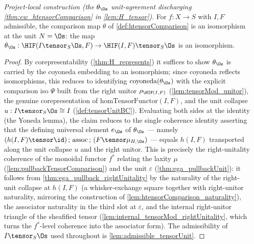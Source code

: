 \begin{lemma}
  \label{lem:htensorComparison_unit_isIso}
  \textit{Project-local construction (the $\theta_{\Os}$ unit-agreement discharging \cref{thm:ew_htensorComparison} in \cref{lem:H_tensor}).}
  For $f : X \to S$ with $I, F$ admissible, the comparison map $\theta$ of \cref{def:htensorComparison}
  is an isomorphism at the unit $N = \Os$: the map
  $\theta_{\Os} : \HIF(I \tensor_S \Os, F) \to \HIF(I,F) \tensor_S \Os$ is an isomorphism.
  \begin{proof}
    By corepresentability (\cref{thm:H_represents}) it suffices to show $\theta_{\Os}$ is carried by
    the coyoneda embedding to an isomorphism; since coyoneda reflects isomorphisms, this reduces to
    identifying $\mathrm{coyoneda}(\theta_{\Os})$ with the explicit comparison iso $\Psi$ built from
    the right unitor $\rho_{\HIF(I,F)}$ (\cref{lem:tensorMod_unitor}), the genuine corepresentation of
    $\mathrm{homTensorFunctor}(I,F)$, and the unit collapse $u : I \tensor_S \Os \cong I$
    (\cref{def:tensorUnitBC}). Evaluating both sides at the identity (the Yoneda lemma), the claim
    reduces to the single coherence identity asserting that the defining universal element $e_{\Os}$ of
    $\theta_{\Os}$ — namely $(h(I,F) \tensor \id) \,;\, \mathrm{assoc} \,;\, (F \tensor \mu_{H,\Os})$ —
    equals $h(I,F)$ transported along the unit collapse $u$ and the right unitor. This is precisely
    the right-unitality coherence of the monoidal functor $f^*$ relating the laxity $\mu$
    (\cref{lem:pullbackTensorComparison}) and the unit $\varepsilon$ (\cref{thm:ega_pullbackUnit}): it
    follows from \cref{thm:ega_pullback_rightUnitality} by the naturality of the right-unit collapse
    at $h(I,F)$ (a whisker-exchange square together with right-unitor naturality, mirroring the
    construction of \cref{lem:htensorComparison_naturality}), the associator naturality in the third
    slot at $\varepsilon$, and the internal right-unitor triangle of the sheafified tensor
    (\cref{lem:internal_tensorMod_rightUnitality}, which turns the $f^*$-level coherence into the
    associator form). The admissibility of $I \tensor_S \Os$ used throughout is
    \cref{lem:admissible_tensorUnit}.
  \end{proof}
\end{lemma}

